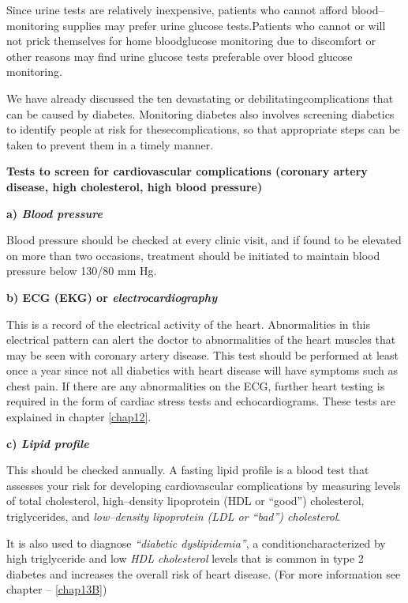 Since urine tests are relatively inexpensive, patients who cannot afford blood–monitoring supplies may prefer urine glucose tests.\break Patients who cannot or will not prick themselves for home blood\break glucose monitoring due to discomfort or other reasons may find urine glucose tests preferable over blood glucose monitoring.


We have already discussed the ten devastating or debilitating\break complications that can be caused by diabetes. Monitoring diabetes also involves screening diabetics to identify people at risk for these\break complications, so that appropriate steps can be taken to prevent them in a timely manner.

\noindent\textbf{Tests to screen for cardiovascular complications (coronary artery disease, high cholesterol, high blood pressure)}

\noindent\textbf{a) \textit{Blood pressure}}

Blood pressure should be checked at every clinic visit, and if found to be elevated on more than two occasions, treatment should be ini\-tiated to maintain blood pressure below 130/80 mm Hg.

\noindent\textbf{b) ECG (EKG) or \textit{electrocardiography}}

This is a record of the electrical activity of the heart. Abnormalities in this electrical pattern can alert the doctor to abnormalities of the heart muscles that may be seen with coronary artery disease. This test should be performed at least once a year since not all diabetics with heart disease will have symptoms such as chest pain. If there are any abnormalities on the ECG, further heart testing is required in the form of cardiac stress tests and echocardiograms. These tests are explained in chapter \ref{chap12}.

\noindent\textbf{c) \textit{Lipid profile}}

This should be checked annually. A fasting lipid profile is a blood test that assesses your risk for developing cardiovascular complications by measuring levels of total cholesterol, high–density lipoprotein (HDL or “good”) cholesterol, triglycerides, and \textit{low–density lipoprotein (LDL or “bad”) cholesterol}.

It is also used to diagnose \textit{“diabetic dyslipidemia”}, a condition\break characterized by high triglyceride and low \textit{HDL cholesterol} levels that is common in type 2 diabetes and increases the overall risk of heart disease. (For more information see chapter – \ref{chap13B})

